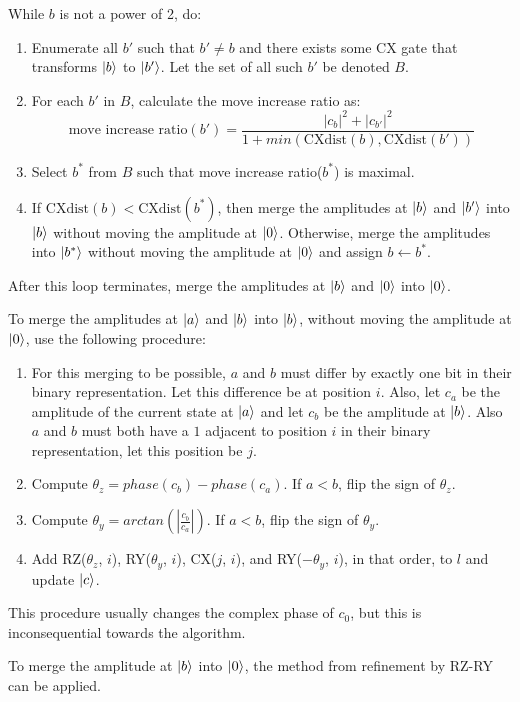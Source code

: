\documentclass{article}
\begin{document}
While $b$ is not a power of 2, do:
\begin{enumerate}
	\item Enumerate all $b'$ such that $b' \neq b$ and there exists some CX gate that
		transforms $\mathinner{|{b}\rangle}$ to $\mathinner{|{b'}\rangle}$. Let the set of all such
		$b'$ be denoted $B$.
	\item For each $b'$ in $B$, calculate the move increase ratio as:
		$$\text{move increase ratio}(b')= \frac{|c_b|^2 + |c_{b'}|^2}{1 
        + min(\text{CXdist}(b), \text{CXdist}(b'))}$$
	\item Select $b^*$ from $B$ such that move increase ratio($b^*$) is
        maximal.
	\item If $\text{CXdist}(b) < \text{CXdist}(b^*)$, then merge the
		amplitudes at $\mathinner{|{b}\rangle}$ and $\mathinner{|{b'}\rangle}$ into $\mathinner{|{b}\rangle}$ without 
		moving the amplitude at $\mathinner{|{0}\rangle}$. Otherwise, merge the 
		amplitudes into $\mathinner{|{b^*}\rangle}$ without moving the amplitude at 
		$\mathinner{|{0}\rangle}$ and assign $b \leftarrow b^*$.
\end{enumerate}
After this loop terminates, merge the amplitudes at $\mathinner{|{b}\rangle}$ and $\mathinner{|{0}\rangle}$ 
into $\mathinner{|{0}\rangle}$.

To merge the amplitudes at $\mathinner{|{a}\rangle}$ and $\mathinner{|{b}\rangle}$ into $\mathinner{|{b}\rangle}$, without
moving the amplitude at $\mathinner{|{0}\rangle}$, use the following procedure:
\begin{enumerate}
	\item For this merging to be possible, $a$ and $b$ must differ by
		exactly one bit in their binary representation. Let this
		difference be at position $i$. Also, let $c_a$ be the amplitude
		of the current state at $\mathinner{|{a}\rangle}$ and let $c_b$ be the amplitude
		at $\mathinner{|{b}\rangle}$. Also $a$ and $b$ must both have a $1$ adjacent to
		position $i$ in their binary representation, let this position
		be $j$.
	\item Compute $\theta_z = phase(c_b) - phase(c_a)$. If $a < b$, flip the
		sign of $\theta_z$.
	\item Compute $\theta_y = arctan(|\frac{c_b}{c_a}|)$. If $a < b$, flip
		the sign of $\theta_y$.
	\item Add RZ($\theta_z$, $i$), RY($\theta_y$, $i$), CX($j$, $i$), and
		RY($-\theta_y$, $i$), in that order, to $l$ and update 
		$\mathinner{|{c}\rangle}$.
\end{enumerate}
This procedure usually changes the complex phase of $c_0$, but this is
inconsequential towards the algorithm.

To merge the amplitude at $\mathinner{|{b}\rangle}$ into $\mathinner{|{0}\rangle}$, the method from refinement
by RZ-RY can be applied.
\end{document}
